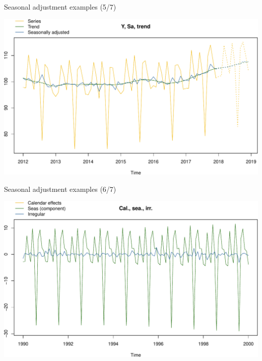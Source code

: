 \documentclass[10pt,xcolor=table,color={dvipsnames,usenames},ignorenonframetext,usepdftitle=false,french]{beamer}
\newenvironment{Shaded}{\begin{snugshade}}{\end{snugshade}}
\newcommand{\DataTypeTok}[1]{\textcolor[rgb]{0.13,0.29,0.53}{#1}}
\newcommand{\DecValTok}[1]{\textcolor[rgb]{0.00,0.00,0.81}{#1}}
\newcommand{\KeywordTok}[1]{\textcolor[rgb]{0.13,0.29,0.53}{\textbf{#1}}}
\newcommand{\NormalTok}[1]{#1}
\newcommand{\OperatorTok}[1]{\textcolor[rgb]{0.81,0.36,0.00}{\textbf{#1}}}
\newcommand{\StringTok}[1]{\textcolor[rgb]{0.31,0.60,0.02}{#1}}
\begin{document}
\begin{frame}[fragile]{Seasonal adjustment examples (5/7)}
\protect\hypertarget{seasonal-adjustment-examples-57}{}

\begin{Shaded}
\end{Shaded}

\includegraphics{img/markdown-unnamed-chunk-11-1.pdf}

\end{frame}

\begin{frame}[fragile]{Seasonal adjustment examples (6/7)}
\protect\hypertarget{seasonal-adjustment-examples-67}{}

\begin{Shaded}
\end{Shaded}

\includegraphics{img/markdown-unnamed-chunk-12-1.pdf}

\end{frame}
\end{document}
